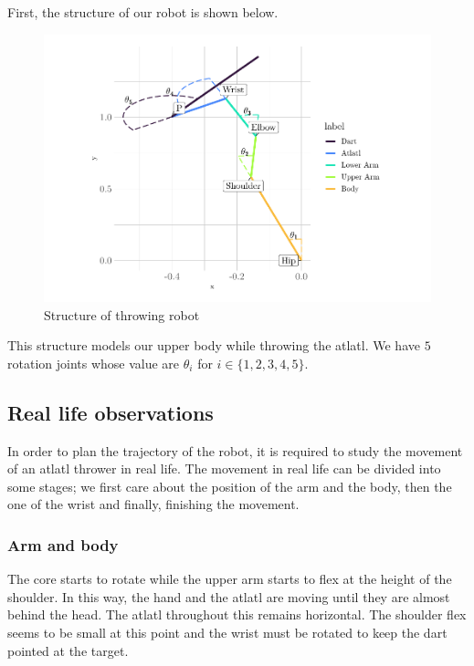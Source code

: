 \documentclass[a4paper, xcolor = usenames,dvipsnames]{article}
\begin{document}
First, the structure of our robot is shown below.

\begin{figure}

{\centering \includegraphics{report_files/figure-latex/initial-model-plot-1} 

}

\caption{Structure of throwing robot}\label{fig:initial-model-plot}
\end{figure}

This structure models our upper body while throwing the atlatl. We have \(5\) rotation joints whose value are \(\theta_{i}\) for \(i \in \{1, 2, 3, 4, 5\}\).

\hypertarget{real-life-observations}{%
\subsection{Real life observations}\label{real-life-observations}}

In order to plan the trajectory of the robot, it is required to study the movement of an atlatl thrower in real life. The movement in real life can be divided into some stages; we first care about the position of the arm and the body, then the one of the wrist and finally, finishing the movement.

\hypertarget{arm-and-body}{%
\subsubsection{Arm and body}\label{arm-and-body}}

The core starts to rotate while the upper arm starts to flex at the height of the shoulder. In this way, the hand and the atlatl are moving until they are almost behind the head. The atlatl throughout this remains horizontal. The shoulder flex seems to be small at this point and the wrist must be rotated to keep the dart pointed at the target.
\end{document}
